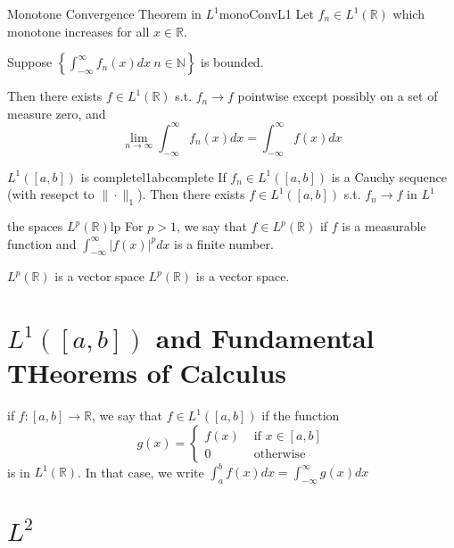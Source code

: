 \documentclass[a4paper]{article}
\newcommand{\R}{\mathbb{R}}
\newcommand{\N}{\mathbb{N}}
\begin{document}
\begin{Theorem}{Monotone Convergence Theorem in $L^1$}{monoConvL1}
	Let $f_n \in L^1(\R)$ which monotone increases for all $x \in \R$.

	Suppose $ \left\{ \int_{-\infty}^{\infty} f_n(x)dx \: n \in \N
	 \right\} $ is bounded.

	 Then there exists $f \in L^1(\R)$ s.t. $f_n \to f$ pointwise except possibly on a set of measure zero, and 
	 \[	 \lim_{n \to \infty} \int_{-\infty}^{\infty} f_n(x) dx = \int_{-\infty}^{\infty}f(x)dx \] 
\end{Theorem}

\begin{Theorem}{$L^1([a,b])$ is complete}{l1abcomplete}
	If $f_n \in  L^1([a,b])$ is a Cauchy sequence (with resepct to $\|\cdot\|_{1} $). Then there exists $f \in L^1([a,b])$ s.t. $f_n \to f$ in $L^1$
\end{Theorem}

\begin{Definition}{the spaces $L^p(\R)$}{lp}
	For $p > 1$, we say that  $f \in L^p(\R)$ if $f$ is a measurable function and  $\int_{-\infty}^{\infty} |f(x)|^p dx  $ is a finite number.
\end{Definition}

\begin{Theorem}{$L^p(\R)$ is a vector space}{}
	$L^p(\R)$ is a vector space.
\end{Theorem}



\section{$L^1([a,b])$ and Fundamental THeorems of Calculus}

\begin{Definition}{}{}
	if $f:[a,b] \to \R$, we say that $f \in L^1([a,b])$ if the function \[
		g(x)=\left\{\begin{array}{ll}
f(x) & \text { if } x \in[a, b] \\
0 & \text { otherwise }
\end{array}\right.
	\] is in $L^1(\R)$. In that case, we write  $\int_a^b f(x) dx = \int_{-\infty}^{\infty}g(x)dx  $
	
\end{Definition}

\section{$L^2$}
\end{document}
